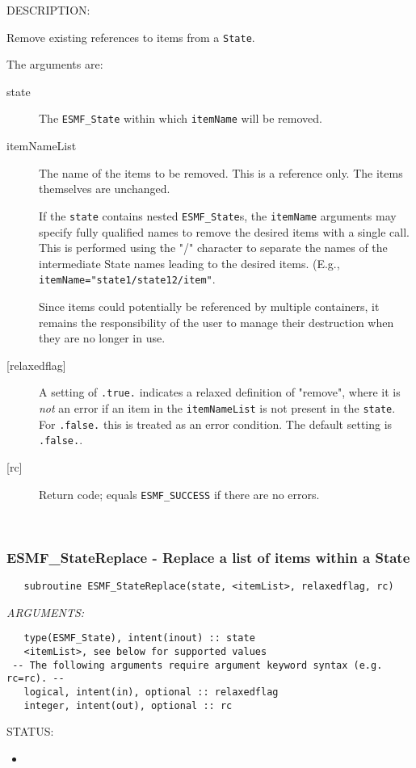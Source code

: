 {\sf DESCRIPTION:\\ }


   Remove existing references to items from a {\tt State}.
  
   The arguments are:
   \begin{description}
   \item[state]
   The {\tt ESMF\_State} within which {\tt itemName} will be removed.
   \item[itemNameList]
   The name of the items to be removed. This is a reference only.
   The items themselves are unchanged.
  
   If the {\tt state} contains nested {\tt ESMF\_State}s,
   the {\tt itemName} arguments may specify fully qualified names
   to remove the desired items with a single call. This is performed
   using the "/" character to separate the names of the intermediate
   State names leading to the desired items. (E.g.,
   {\tt itemName="state1/state12/item"}.
  
   Since items could potentially be referenced by multiple containers,
   it remains the responsibility of the user to manage their
   destruction when they are no longer in use.
   \item[{[relaxedflag]}]
   A setting of {\tt .true.} indicates a relaxed definition of "remove",
   where it is {\em not} an error if an item in the {\tt itemNameList}
   is not present in the {\tt state}. For {\tt .false.} this is treated
   as an error condition. The default setting is {\tt .false.}.
   \item[{[rc]}]
   Return code; equals {\tt ESMF\_SUCCESS} if there are no errors.
   \end{description} 
 
\mbox{}\hrulefill\ 
 
\subsubsection [ESMF\_StateReplace] {ESMF\_StateReplace - Replace a list of items within a State}


  
\begin{verbatim}   subroutine ESMF_StateReplace(state, <itemList>, relaxedflag, rc)\end{verbatim}{\em ARGUMENTS:}
\begin{verbatim}   type(ESMF_State), intent(inout) :: state
   <itemList>, see below for supported values
 -- The following arguments require argument keyword syntax (e.g. rc=rc). --
   logical, intent(in), optional :: relaxedflag
   integer, intent(out), optional :: rc\end{verbatim}
{\sf STATUS:}
   \begin{itemize}
   \item{}
   \end{itemize}
  
